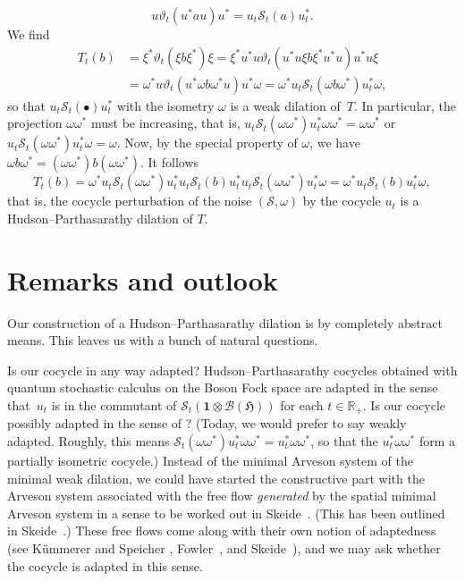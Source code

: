\documentclass[pdftex]{sigma}%
\newcommand{\mbf}[1]{\mathbf{#1}}
\newcommand{\eus}[1]{\mathscr{#1}}
\newcommand{\euf}[1]{\mathfrak{#1}}
\newcommand{\bb}[1]{\mathbb{#1}}
\newcommand{\vt}{\vartheta}
\newcommand{\om}{\omega}
\newcommand{\R}{\bb{R}}
\newcommand{\sB}{\eus{B}}
\newcommand{\sS}{\eus{S}}
\newcommand{\eH}{\euf{H}}
\newcommand{\U}{\mbf{1}}
\numberwithin{equation}{section}
\begin{document}
\[
u\vt_t(u^*au)u^*=u_t\sS_t(a)u_t^*.
\]
We find
\begin{align*}
T_t(b) & = \xi^*\vt_t(\xi b\xi^*)\xi=\xi^*u^*u\vt_t(u^*u\xi b\xi^*u^*u)u^*u\xi\\
& = \om^*u\vt_t(u^*\om b\om^*u)u^*\om=\om^*u_t\sS_t(\om b\om^*)u_t^*\om,
\end{align*}
so that $u_t\sS_t(\bullet)u_t^*$ with the isometry $\om$ is a weak dilation of~$T$. In particular, the projection $\om\om^*$ must be increasing, that is, $u_t\sS_t(\om\om^*)u_t^*\om\om^*=\om\om^*$ or $u_t\sS_t(\om\om^*)u_t^*\om=\om$. Now, by the special property of $\om$, we have $\om b\om^*=(\om\om^*)b(\om\om^*)$. It follows
\[
T_t(b)
=\om^*u_t\sS_t(\om \om^*)u_t^*u_t\sS_t(b)u_t^*u_t\sS_t(\om \om^*)u_t^*\om
=\om^*u_t\sS_t(b)u_t^*\om,
\]
that is, the cocycle perturbation of the noise $(\sS,\om)$ by the cocycle $u_t$ is a Hudson--Parthasarathy dilation of $T$.

\section{Remarks and outlook}\label{remSEC}

Our construction of a Hudson--Parthasarathy dilation is by completely abstract means. This leaves us with a bunch of natural questions.

Is our cocycle in any way adapted? Hudson--Parthasarathy cocycles obtained with quantum stochastic calculus on the Boson Fock space are adapted in the sense that~$u_t$ is in the commutant of $\sS_t(\U\otimes\sB(\eH))$ for each $t\in\R_+$. Is our cocycle possibly adapted in the sense of \cite[Definition~7.4]{BhSk00}? (Today, we would prefer to say weakly adapted. Roughly, this means $\sS_t(\om\om^*)u_t^*\om\om^*=u_t^*\om\om^*$, so that the $u_t^*\om\om^*$ form a partially isometric cocycle.) Instead of the minimal Arveson system of the minimal weak dilation, we could have started the constructive part with the Arveson system associated with the free flow {\it generated} by the spatial minimal Arveson system in a sense to be worked out in Skeide~\cite{Ske08p2}. (This has been outlined in Skeide~\cite{Ske06d}.) These free flows come along with their own notion of adaptedness (see K\"ummerer and Speicher \cite{KueSp92}, Fowler~\cite{Fow95}, and Skeide~\cite{Ske00}), and we may ask whether the cocycle is adapted in this sense.
\end{document}
